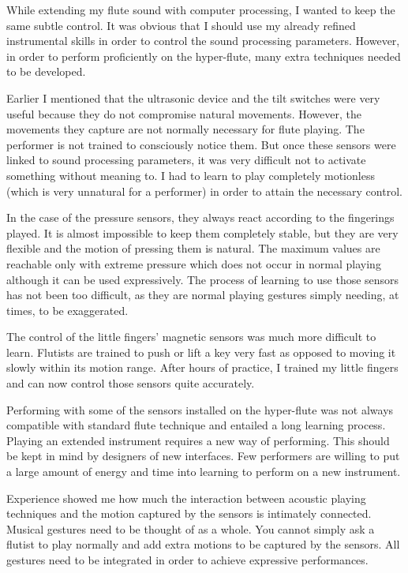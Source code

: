 While extending my flute sound with computer processing, I wanted to keep the same subtle control. It was obvious that I should use my already refined instrumental skills in order to control the sound processing parameters. However, in order to perform proficiently on the hyper-flute, many extra techniques needed to be developed.

Earlier I mentioned that the ultrasonic device and the tilt switches were very useful because they do not compromise natural movements. However, the movements they capture are not normally necessary for flute playing. The performer is not trained to consciously notice them.  But once these sensors were linked to sound processing parameters, it was very difficult not to activate something without meaning to.  I had to learn to play completely motionless (which is very unnatural for a performer) in order to attain the necessary control.

In the case of the pressure sensors, they always react according to the fingerings played. It is almost impossible to keep them completely stable, but they are very flexible and the motion of pressing them is natural.  The maximum values are reachable only with extreme pressure which does not occur in normal playing although it can be used expressively. The process of learning to use those sensors has not been too difficult, as they are normal playing gestures simply needing, at times, to be exaggerated.

The control of the little fingers' magnetic sensors was much more difficult to learn. Flutists are trained to push or lift a key very fast as opposed to moving it slowly within its motion range. After hours of practice, I trained my little fingers and can now control those sensors quite accurately. 

Performing with some of the sensors installed on the hyper-flute was not always compatible with standard flute technique and entailed a long learning process. Playing an extended instrument requires a new way of performing.  This should be kept in mind by designers of new interfaces.  Few performers are willing to put a large amount of energy and time into learning to perform on a new instrument.

Experience showed me how much the interaction between acoustic playing techniques and the motion captured by the sensors is intimately connected. Musical gestures need to be thought of as a whole. You cannot simply ask a flutist to play normally and add extra motions to be captured by the sensors. All gestures need to be integrated in order to achieve expressive performances. 

